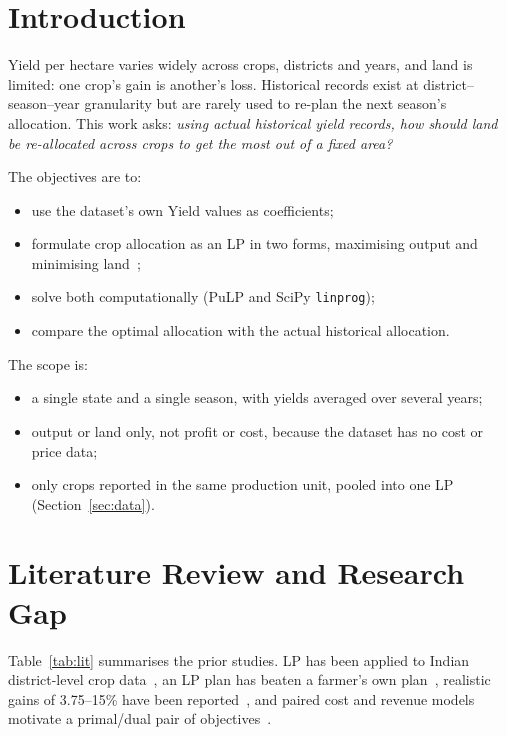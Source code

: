 \documentclass[conference]{IEEEtran}
\begin{document}
\section{Introduction}
Yield per hectare varies widely across crops, districts and years, and land is limited: one
crop's gain is another's loss. Historical records exist at district--season--year
granularity but are rarely used to re-plan the next season's allocation. This work asks:
\emph{using actual historical yield records, how should land be re-allocated across crops to
get the most out of a fixed area?}

The objectives are to:
\begin{itemize}
  \item use the dataset's own Yield values as coefficients;
  \item formulate crop allocation as an LP in two forms, maximising output and minimising land~\cite{taha2017};
  \item solve both computationally (PuLP and SciPy \texttt{linprog});
  \item compare the optimal allocation with the actual historical allocation.
\end{itemize}

The scope is:
\begin{itemize}
  \item a single state and a single season, with yields averaged over several years;
  \item output or land only, not profit or cost, because the dataset has no cost or price data;
  \item only crops reported in the same production unit, pooled into one LP (Section~\ref{sec:data}).
\end{itemize}

\section{Literature Review and Research Gap}
Table~\ref{tab:lit} summarises the prior studies. LP has been applied to Indian district-level
crop data~\cite{wankhade2012}, an LP plan has beaten a farmer's own plan~\cite{majeke2020},
realistic gains of 3.75--15\% have been reported~\cite{supriya2022}, and paired cost and
revenue models motivate a primal/dual pair of objectives~\cite{paidipati2017,liang2023}.
\end{document}
